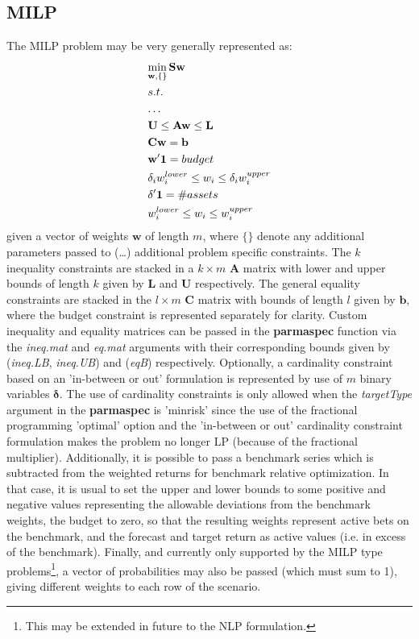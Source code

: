 \subsection{MILP}
The MILP problem may be very generally represented as:
\begin{equation}\label{milp}
\begin{gathered}
  \mathop {\min }\limits_{{\mathbf{w}},\{\}} {\mathbf{Sw}} \hfill \\
  s.t. \hfill \\
  \dots \hfill \\
  {\mathbf{U}} \leq {\mathbf{Aw}} \leq {\mathbf{L}} \hfill \\
  {\mathbf{Cw}}={\mathbf{b}} \hfill \\
  {\mathbf{w'1}}=budget \hfill \\
  {\delta _i}w_i^{lower} \leq {w_i} \leq {\delta _i}w_i^{upper} \hfill \\
  {\mathbf{\delta '1}}=\# assets \hfill \\
  w_i^{lower} \leq {w_i} \leq w_i^{upper}\hfill \\
\end{gathered}
\end{equation}
given a vector of weights $\mathbf{w}$ of length $m$, where $\{\}$ denote any
additional parameters passed to (\dots) additional problem specific
constraints. The $k$ inequality constraints are stacked in a $k\times m$
$\mathbf{A}$ matrix with lower and upper bounds of length $k$ given by
$\mathbf{L}$ and $\mathbf{U}$ respectively. The general equality constraints
are stacked in the $l\times m$ $\mathbf{C}$ matrix with bounds of length $l$
given by $\mathbf{b}$, where the budget constraint is represented separately
for clarity. Custom inequality and equality matrices can be passed in the
\textbf{parmaspec} function via the \emph{ineq.mat} and \emph{eq.mat}
arguments with their corresponding bounds given by (\emph{ineq.LB},
\emph{ineq.UB}) and (\emph{eqB}) respectively. Optionally, a cardinality
constraint based on an 'in-between or out' formulation is represented by use
of $m$ binary variables $\mathbf{\delta}$. The use of cardinality constraints
is only allowed when the \emph{targetType} argument in the \textbf{parmaspec}
is 'minrisk' since the use of the fractional programming 'optimal' option and
the 'in-between or out' cardinality constraint formulation makes the problem
no longer LP (because of the fractional multiplier). Additionally, it is possible
to pass a benchmark series which is subtracted from the weighted returns for
benchmark relative optimization. In that case, it is usual to set the upper and
lower bounds to some positive and negative values representing the allowable
deviations from the benchmark weights, the budget to zero, so that the
resulting weights represent active bets on the benchmark, and the forecast and
target return as active values (i.e. in excess of the benchmark). Finally,
and currently only supported by the MILP type problems\footnote{This may be extended in
future to the NLP formulation.}, a vector of probabilities may also be passed
(which must sum to 1), giving different weights to each row of the scenario.

